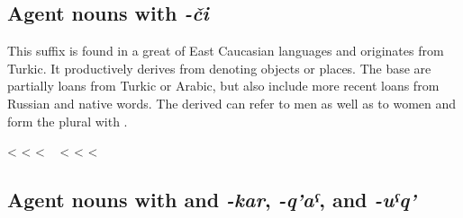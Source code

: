 
\subsection{Agent nouns with \textit{-či}}
\label{subsection:Agent nouns with -či}

This suffix is found in a great  of East Caucasian languages and originates from Turkic. It productively derives   from  denoting objects or places. The base  are partially loans from Turkic or Arabic, but also include more recent loans from Russian and native words. The derived  can refer to men as well as to women and form the plural with .
%
\begin{exe}
	\ex	\label{masqaranjoke}
	\begin{xlist}
		\TabPositions{14em,16em}
		\ex	{} 		\tab	<	\tab	{} 
		\ex	{} 			\tab	<	\tab	{} 
		\ex	{} 			\tab	<	\tab	{} 		
		\ex	{} 
		\sn	~\hspace*{1em}						\tab	<	\tab	{} 
		\ex	{} 				\tab	<	\tab	{} 
		\ex	{} 		\tab	<	\tab	{} 
	\end{xlist}
\end{exe}



\subsection{Agent nouns with and \textit{-kar}, \textit{-q'aˁ}, and \textit{-uˁq'}}
\label{ssec:Agent nouns with -q'aˁ, -uˁq' and -kar}

